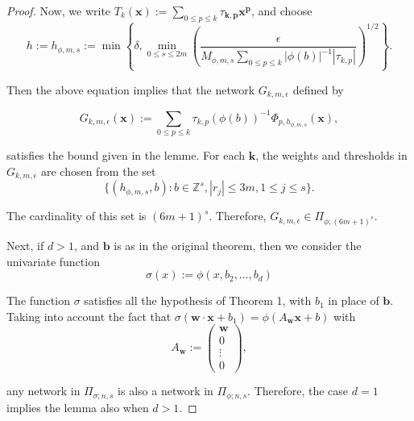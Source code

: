 \documentclass[11pt,a4paper]{article}
\theoremstyle{plain}
\theoremstyle{definition}
\theoremstyle{remark}
\numberwithin{equation}{section}
\begin{document}
\begin{proof}
Now, we write \( T_k(\mathbf{x}) := \sum_{0\leq p \leq k} \tau_{ \mathbf{k},\mathbf{p} } \mathbf{x}^{\mathbf{p}} \), and choose
\begin{equation}
    h := h_{\phi,m,s} := \min \left\{ \delta, \min_{0\leq s \leq 2m} \left( \frac{\epsilon}{M_{\phi,m,s} \sum_{0 \leq p \leq k} |\phi(b)|^{-1} |\tau_{k,p}|} \right)^{1/2} \right\}.
\end{equation}

Then the above equation implies that the network \( G_{k,m,\epsilon} \) defined by

\begin{equation}
    G_{k,m,\epsilon}(\mathbf{x}) := \sum_{0 \leq p \leq k} \tau_{k,p}(\phi(b))^{-1} \Phi_{p,h_{\phi,m,s}}(\mathbf{x}),
\end{equation}

satisfies the bound given in the lemme. For each \( \mathbf{k} \), the weights and thresholds in \( G_{k,m,\epsilon} \) are chosen from the set
\begin{equation}
    \{ (h_{\phi,m,s}, b) : b \in \mathbb{Z}^s, |r_{j}| \leq 3m, 1 \leq j \leq s \}.
\end{equation}

The cardinality of this set is \( (6m + 1)^s \). Therefore, \( G_{k,m,\epsilon} \in \Pi_{\phi;(6m+1)^s} \).

Next, if \(d >1\), and \(\mathbf{b}\) is as in the original theorem, then we consider the univariate function
\begin{equation}
    \sigma (x) := \phi (x, b_2, \ldots, b_d)
\end{equation}

The function \( \sigma \) satisfies all the hypothesis of Theorem 1, with \( b_1 \) in place of \( \mathbf{b}  \). Taking into account the fact that \( \sigma(\mathbf{w} \cdot \mathbf{x} + b_1) = \phi(A_{\mathbf{w}}\mathbf{x} + b) \) with
\begin{equation}
    A_{\mathbf{w}} := \begin{pmatrix}
        \mathbf{w} \\
        0 \\
        \vdots \\
        0
    \end{pmatrix},
\end{equation}

any network in \( \Pi_{\sigma;n,s} \) is also a network in \( \Pi_{\phi;n,s} \). Therefore, the case \( d = 1 \) implies the lemma also when \( d > 1 \).
\end{proof}
\end{document}
